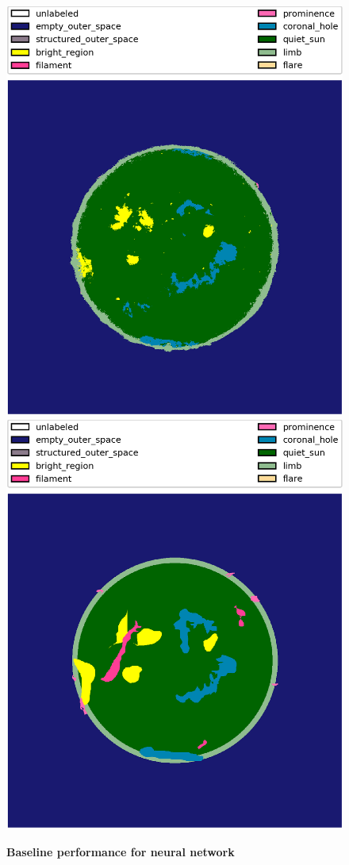 \documentclass[twoside]{report}
\begin{document}
\begin{figure}[ht]
  \begin{center}
    \includegraphics[scale=0.2]{base_rf}
    \includegraphics[scale=0.2]{base_rf_gold}
    \caption{{\bf Baseline performance for neural network}}
    \label{fig:base-nn}
 \end{center}
\end{figure}
\end{document}
